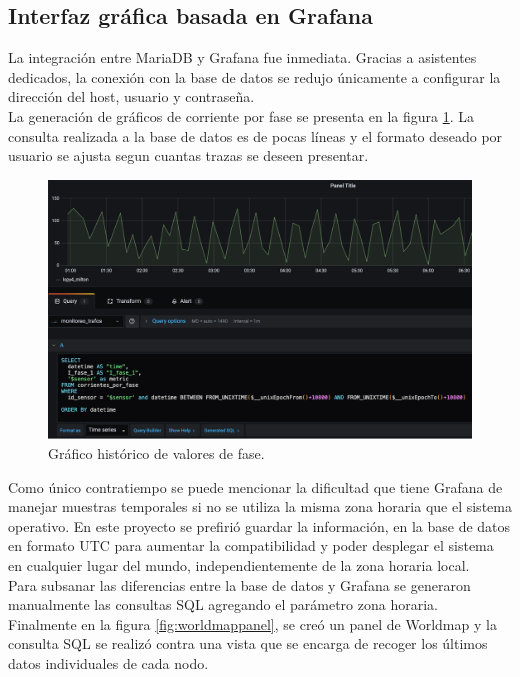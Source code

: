 \subsection{Interfaz gráfica basada en Grafana}
La integración entre MariaDB y Grafana fue inmediata. Gracias a asistentes dedicados, la conexión con la base de datos se redujo únicamente a configurar la dirección del host, usuario y contraseña.\\
La generación de gráficos de corriente por fase se presenta en la figura \ref{fig:historicofase}. La consulta realizada a la base de datos es de pocas líneas y el formato deseado por usuario se ajusta segun cuantas trazas se deseen presentar.\\
\begin{figure}[h]
	\centering
	\includegraphics[width=0.9\linewidth]{Figures/historico_fase}
	\caption{Gráfico histórico de valores de fase.}
	\label{fig:historicofase}
\end{figure}
Como único contratiempo se puede mencionar la dificultad que tiene Grafana de manejar muestras temporales si no se utiliza la misma zona horaria que el sistema operativo. En este proyecto se prefirió guardar la información, en la base de datos en formato UTC para aumentar la compatibilidad y poder desplegar el sistema en cualquier lugar del mundo, independientemente de la zona horaria local.\\
Para subsanar las diferencias entre la base de datos y Grafana se generaron manualmente las consultas SQL agregando el parámetro zona horaria.\\
Finalmente en la figura \ref{fig:worldmappanel}, se creó un panel de Worldmap y la consulta SQL se realizó contra una vista que se encarga de recoger los últimos datos individuales de cada nodo.\\
